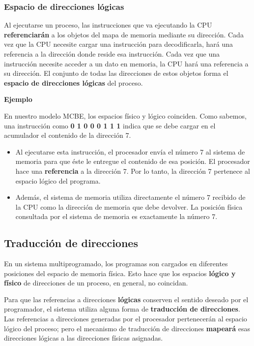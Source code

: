 \documentclass[spanish,A4,]{article}
\begin{document}
\subsubsection{Espacio de direcciones
lógicas}\label{espacio-de-direcciones-luxf3gicas}

Al ejecutarse un proceso, las instrucciones que va ejecutando la CPU
\textbf{referenciarán} a los objetos del mapa de memoria mediante su
dirección. Cada vez que la CPU necesite cargar una instrucción para
decodificarla, hará una referencia a la dirección donde reside esa
instrucción. Cada vez que una instrucción necesite acceder a un dato en
memoria, la CPU hará una referencia a su dirección. El conjunto de todas
las direcciones de estos objetos forma el \textbf{espacio de direcciones
lógicas} del proceso.

\textbf{Ejemplo}

En nuestro modelo MCBE, los espacios físico y lógico coinciden. Como
sabemos, una instrucción como \textbf{0 1 0 0 0 1 1 1} indica que se debe
cargar en el acumulador el contenido de la dirección 7.

\begin{itemize}
\itemsep1pt\parskip0pt
\item
  Al ejecutarse esta instrucción, el procesador envía el número 7 al
  sistema de memoria para que éste le entregue el contenido de esa
  posición. El procesador hace una \textbf{referencia} a la dirección 7.
  Por lo tanto, la dirección 7 pertenece al espacio lógico del programa.
\item
  Además, el sistema de memoria utiliza directamente el número 7
  recibido de la CPU como la dirección de memoria que debe devolver. La
  posición física consultada por el sistema de memoria es exactamente la
  número 7.
\end{itemize}

\subsection{Traducción de
direcciones}\label{traducciuxf3n-de-direcciones}

En un sistema multiprogramado, los programas son cargados en diferentes
posiciones del espacio de memoria física. Esto hace que los espacios
\textbf{lógico y físico} de direcciones de un proceso, en general, no
coincidan.

Para que las referencias a direcciones \textbf{lógicas} conserven el
sentido deseado por el programador, el sistema utiliza alguna forma de
\textbf{traducción de direcciones}. Las referencias a direcciones
generadas por el procesador pertenecerán al espacio lógico del proceso;
pero el mecanismo de traducción de direcciones \textbf{mapeará} esas
direcciones lógicas a las direcciones físicas asignadas.
\end{document}
